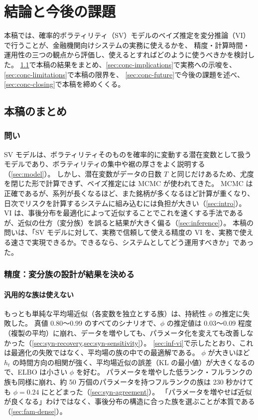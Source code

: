 \section{結論と今後の課題}\label{sec:conclusion}

本稿では、確率的ボラティリティ（SV）モデルのベイズ推定を変分推論（VI）で行うことが、金融機関向けシステムの実務に使えるかを、
精度・計算時間・運用性の三つの観点から評価し、使えるとすればどのように使うべきかを検討した。
\cref{sec:conc-summary}で本稿の結果をまとめ、\cref{sec:conc-implications}で実務への示唆を、\cref{sec:conc-limitations}で本稿の限界を、
\cref{sec:conc-future}で今後の課題を述べ、\cref{sec:conc-closing}で本稿を締めくくる。

\subsection{本稿のまとめ}\label{sec:conc-summary}

\subsubsection{問い}

SV モデルは、ボラティリティそのものを確率的に変動する潜在変数として扱うモデルであり、ボラティリティの集中や裾の厚さをよく説明する（\cref{sec:model}）。
しかし、潜在変数がデータの日数 $T$ と同じだけあるため、尤度を閉じた形で計算できず、ベイズ推定には MCMC が使われてきた。
MCMC は正確であるが、系列が長くなるほど、また銘柄が多くなるほど計算が重くなり、日次でリスクを計算するシステムに組み込むには負担が大きい（\cref{sec:intro}）。
VI は、事後分布を最適化によって近似することでこれを速くする手法であるが、近似の仕方（変分族）を誤ると結果が大きく偏る（\cref{sec:inference}）。
本稿の問いは、「SV モデルに対して、実務で信頼して使える精度の VI を、実務で使える速さで実現できるか。できるなら、システムとしてどう運用すべきか」であった。

\subsubsection{精度：変分族の設計が結果を決める}

\paragraph{汎用的な族は使えない}
もっとも単純な平均場近似（各変数を独立とする族）は、持続性 $\phi$ の推定に失敗した。
真値 0.80〜0.99 のすべてのシナリオで、$\phi$ の推定値は 0.03〜0.09 程度（複製の平均）に崩れ、データを増やしても、パラメータ化を変えても改善しなかった（\cref{sec:syn-recovery,sec:syn-sensitivity}）。
\cref{sec:inf-vi}で示したとおり、これは最適化の失敗ではなく、平均場の族の中での最適解である。
$\phi$ が大きいほど $h_t$ の時間方向の相関が強く、平均場近似の誤差（KL の最小値）が大きくなるので、ELBO は小さい $\phi$ を好む。
パラメータを増やした低ランク・フルランクの族も同様に崩れ、約 50 万個のパラメータを持つフルランクの族は 230 秒かけても $\phi = 0.24$ にとどまった（\cref{sec:syn-agreement}）。
「パラメータを増やせば近似が良くなる」わけではなく、事後分布の構造に合った族を選ぶことが本質である（\cref{sec:fam-dense}）。

